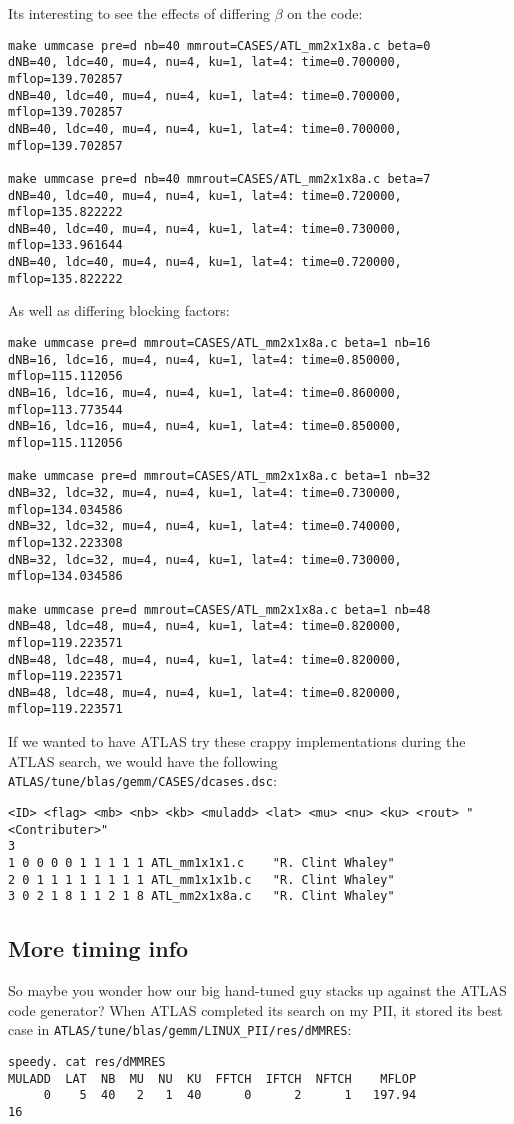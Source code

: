 \documentclass[11pt]{article}
\begin{document}
Its interesting to see the effects of differing $\beta$ on the code:
\begin{verbatim}
make ummcase pre=d nb=40 mmrout=CASES/ATL_mm2x1x8a.c beta=0
dNB=40, ldc=40, mu=4, nu=4, ku=1, lat=4: time=0.700000, mflop=139.702857
dNB=40, ldc=40, mu=4, nu=4, ku=1, lat=4: time=0.700000, mflop=139.702857
dNB=40, ldc=40, mu=4, nu=4, ku=1, lat=4: time=0.700000, mflop=139.702857

make ummcase pre=d nb=40 mmrout=CASES/ATL_mm2x1x8a.c beta=7
dNB=40, ldc=40, mu=4, nu=4, ku=1, lat=4: time=0.720000, mflop=135.822222
dNB=40, ldc=40, mu=4, nu=4, ku=1, lat=4: time=0.730000, mflop=133.961644
dNB=40, ldc=40, mu=4, nu=4, ku=1, lat=4: time=0.720000, mflop=135.822222
\end{verbatim}

As well as differing blocking factors:
\begin{verbatim}
make ummcase pre=d mmrout=CASES/ATL_mm2x1x8a.c beta=1 nb=16
dNB=16, ldc=16, mu=4, nu=4, ku=1, lat=4: time=0.850000, mflop=115.112056
dNB=16, ldc=16, mu=4, nu=4, ku=1, lat=4: time=0.860000, mflop=113.773544
dNB=16, ldc=16, mu=4, nu=4, ku=1, lat=4: time=0.850000, mflop=115.112056

make ummcase pre=d mmrout=CASES/ATL_mm2x1x8a.c beta=1 nb=32
dNB=32, ldc=32, mu=4, nu=4, ku=1, lat=4: time=0.730000, mflop=134.034586
dNB=32, ldc=32, mu=4, nu=4, ku=1, lat=4: time=0.740000, mflop=132.223308
dNB=32, ldc=32, mu=4, nu=4, ku=1, lat=4: time=0.730000, mflop=134.034586

make ummcase pre=d mmrout=CASES/ATL_mm2x1x8a.c beta=1 nb=48
dNB=48, ldc=48, mu=4, nu=4, ku=1, lat=4: time=0.820000, mflop=119.223571
dNB=48, ldc=48, mu=4, nu=4, ku=1, lat=4: time=0.820000, mflop=119.223571
dNB=48, ldc=48, mu=4, nu=4, ku=1, lat=4: time=0.820000, mflop=119.223571
\end{verbatim}

If we wanted to have ATLAS try these crappy implementations during the
ATLAS search, we would have the following
{\tt ATLAS/tune/blas/gemm/CASES/dcases.dsc}:
\begin{verbatim}
<ID> <flag> <mb> <nb> <kb> <muladd> <lat> <mu> <nu> <ku> <rout> "<Contributer>"
3
1 0 0 0 0 1 1 1 1 1 ATL_mm1x1x1.c    "R. Clint Whaley"
2 0 1 1 1 1 1 1 1 1 ATL_mm1x1x1b.c   "R. Clint Whaley"
3 0 2 1 8 1 1 2 1 8 ATL_mm2x1x8a.c   "R. Clint Whaley"
\end{verbatim}

\subsection{More timing info}
So maybe you wonder how our big hand-tuned guy stacks up against the ATLAS
code generator?  When ATLAS completed its search on my PII, it stored its
best case in {\tt ATLAS/tune/blas/gemm/LINUX\_PII/res/dMMRES}:
\begin{verbatim}
speedy. cat res/dMMRES 
MULADD  LAT  NB  MU  NU  KU  FFTCH  IFTCH  NFTCH    MFLOP
     0    5  40   2   1  40      0      2      1   197.94
16
\end{verbatim}
\end{document}
